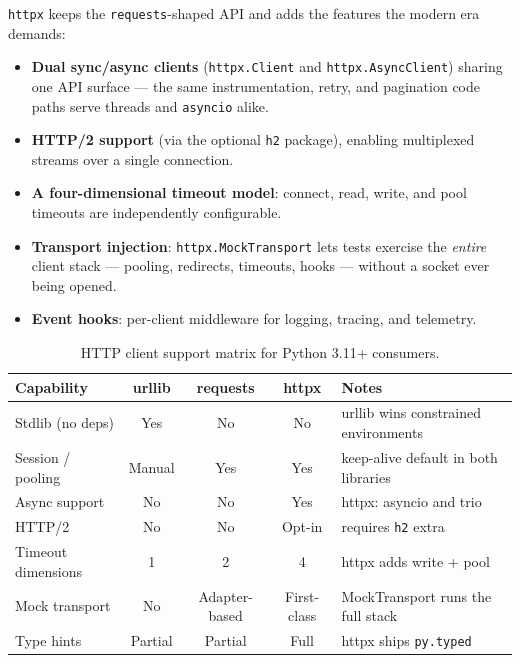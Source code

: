\texttt{httpx} \cite{httpxdocs} keeps the \texttt{requests}-shaped API and
adds the features the modern era demands:

\begin{itemize}
  \item \textbf{Dual sync/async clients} (\texttt{httpx.Client} and
        \texttt{httpx.AsyncClient}) sharing one API surface --- the same
        instrumentation, retry, and pagination code paths serve threads and
        \texttt{asyncio} alike.
  \item \textbf{HTTP/2 support} (via the optional \texttt{h2} package),
        enabling multiplexed streams over a single connection.
  \item \textbf{A four-dimensional timeout model}: connect, read, write, and
        pool timeouts are independently configurable.
  \item \textbf{Transport injection}: \texttt{httpx.MockTransport} lets tests
        exercise the \emph{entire} client stack --- pooling, redirects,
        timeouts, hooks --- without a socket ever being opened.
  \item \textbf{Event hooks}: per-client middleware for logging, tracing, and
        telemetry.
\end{itemize}

\begin{table}[h]
  \centering
  \small
  \begin{tabularx}{\textwidth}{l c c c X}
    \toprule
    \textbf{Capability} & \textbf{urllib} & \textbf{requests} & \textbf{httpx} & \textbf{Notes} \\
    \midrule
    Stdlib (no deps)      & Yes & No  & No  & urllib wins constrained environments \\
    Session / pooling     & Manual & Yes & Yes & keep-alive default in both libraries \\
    Async support         & No  & No  & Yes & httpx: asyncio and trio \\
    HTTP/2                & No  & No  & Opt-in & requires \texttt{h2} extra \\
    Timeout dimensions    & 1   & 2   & 4   & httpx adds write + pool \\
    Mock transport        & No  & Adapter-based & First-class & MockTransport runs the full stack \\
    Type hints            & Partial & Partial & Full & httpx ships \texttt{py.typed} \\
    \bottomrule
  \end{tabularx}
  \caption{HTTP client support matrix for Python 3.11+ consumers.}
  \label{tab:ch02-client-matrix}
\end{table}

